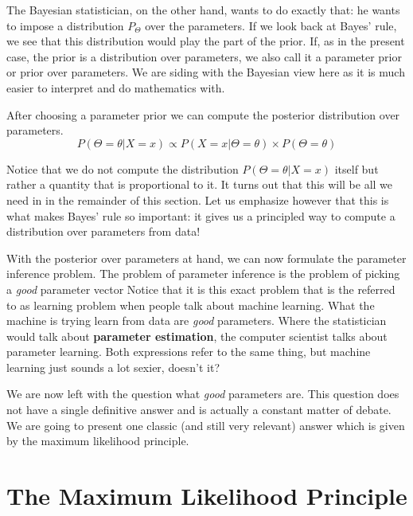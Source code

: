 The Bayesian statistician, on the other hand, wants to do exactly that: he wants to impose a distribution $ P_{\Theta} $ over the parameters. 
If we look back at Bayes' rule, we see that this distribution would play the part of the prior. If, as in the present case, the prior is a distribution over parameters,
we also call it a parameter prior or prior over parameters. We are siding with the Bayesian view here as it is much easier to interpret and do mathematics with.

After choosing a parameter prior we can compute the posterior distribution over parameters.
\begin{equation}
P(\Theta = \theta|X =x) \propto P(X=x|\Theta = \theta) \times P(\Theta = \theta)
\end{equation}

Notice that we do not compute the distribution $ P(\Theta = \theta|X =x) $ itself but rather a quantity that is proportional to it. It turns out that this will be all
we need in in the remainder of this section. Let us emphasize however that this is what makes Bayes' rule so important: it gives us a principled way to compute a
distribution over parameters from data!

With the posterior over parameters at hand, we can now formulate the parameter inference problem. The problem of parameter inference is the problem of picking
a \emph{good} parameter vector Notice that it is this exact problem that is the referred to as learning
problem when people talk about machine learning. What the machine is trying learn from data are \emph{good} parameters. Where the statistician would talk about
\textbf{parameter estimation}, the computer scientist talks about parameter learning. Both expressions refer to the same thing, but machine learning just sounds a lot
sexier, doesn't it?

We are now left with the question what \emph{good} parameters are. This question does not have a single definitive answer and is actually a constant matter of debate. We
are going to present one classic (and still very relevant) answer which is given by the maximum likelihood principle.


\section{The Maximum Likelihood Principle}